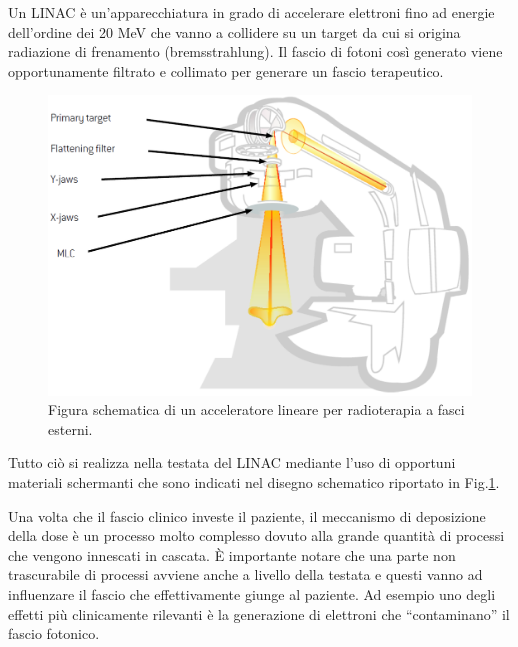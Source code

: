 Un LINAC è un'apparecchiatura in grado di accelerare elettroni fino ad energie dell'ordine dei 20 MeV che vanno a collidere su un target da cui si origina radiazione di frenamento (bremsstrahlung). Il fascio di fotoni così generato viene opportunamente filtrato e collimato per generare un fascio terapeutico. 
\begin{figure}
\centering
\includegraphics[width=.7\textwidth]{./cap1/linac.png}
\caption{Figura schematica di un acceleratore lineare per radioterapia a fasci esterni.}
\label{fig:linac}
\end{figure}
Tutto ciò si realizza nella testata del LINAC mediante l'uso di opportuni materiali schermanti che sono indicati nel disegno schematico riportato in Fig.\ref{fig:linac}.

Una volta che il fascio clinico investe il paziente, il meccanismo di deposizione della dose è un processo molto complesso dovuto alla grande quantità di processi che vengono innescati in cascata. \`{E} importante notare che una parte non trascurabile di processi avviene anche a livello della testata e questi vanno ad influenzare il fascio che effettivamente giunge al paziente. Ad esempio uno degli effetti più clinicamente rilevanti è la generazione di elettroni che \textquotedblleft contaminano\textquotedblright{} il fascio fotonico.

